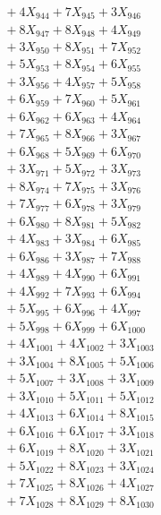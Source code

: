\documentclass[a4paper,10pt]{article}
\begin{document}
{\begin{align}
&\;  + 4 X_{944} + 7 X_{945} + 3 X_{946} \\[0.3ex]
&\;  + 8 X_{947} + 8 X_{948} + 4 X_{949} \\[0.3ex]
&\;  + 3 X_{950} + 8 X_{951} + 7 X_{952} \\[0.3ex]
&\;  + 5 X_{953} + 8 X_{954} + 6 X_{955} \\[0.3ex]
&\;  + 3 X_{956} + 4 X_{957} + 5 X_{958} \\[0.3ex]
&\;  + 6 X_{959} + 7 X_{960} + 5 X_{961} \\[0.3ex]
&\;  + 6 X_{962} + 6 X_{963} + 4 X_{964} \\[0.3ex]
&\;  + 7 X_{965} + 8 X_{966} + 3 X_{967} \\[0.3ex]
&\;  + 6 X_{968} + 5 X_{969} + 6 X_{970} \\[0.5ex]\allowbreak
&\;  + 3 X_{971} + 5 X_{972} + 3 X_{973} \\[0.3ex]
&\;  + 8 X_{974} + 7 X_{975} + 3 X_{976} \\[0.3ex]
&\;  + 7 X_{977} + 6 X_{978} + 3 X_{979} \\[0.3ex]
&\;  + 6 X_{980} + 8 X_{981} + 5 X_{982} \\[0.3ex]
&\;  + 4 X_{983} + 3 X_{984} + 6 X_{985} \\[0.3ex]
&\;  + 6 X_{986} + 3 X_{987} + 7 X_{988} \\[0.3ex]
&\;  + 4 X_{989} + 4 X_{990} + 6 X_{991} \\[0.3ex]
&\;  + 4 X_{992} + 7 X_{993} + 6 X_{994} \\[0.3ex]
&\;  + 5 X_{995} + 6 X_{996} + 4 X_{997} \\[0.3ex]
&\;  + 5 X_{998} + 6 X_{999} + 6 X_{1000} \\[0.5ex]\allowbreak
&\;  + 4 X_{1001} + 4 X_{1002} + 3 X_{1003} \\[0.3ex]
&\;  + 3 X_{1004} + 8 X_{1005} + 5 X_{1006} \\[0.3ex]
&\;  + 5 X_{1007} + 3 X_{1008} + 3 X_{1009} \\[0.3ex]
&\;  + 3 X_{1010} + 5 X_{1011} + 5 X_{1012} \\[0.3ex]
&\;  + 4 X_{1013} + 6 X_{1014} + 8 X_{1015} \\[0.3ex]
&\;  + 6 X_{1016} + 6 X_{1017} + 3 X_{1018} \\[0.3ex]
&\;  + 6 X_{1019} + 8 X_{1020} + 3 X_{1021} \\[0.3ex]
&\;  + 5 X_{1022} + 8 X_{1023} + 3 X_{1024} \\[0.3ex]
&\;  + 7 X_{1025} + 8 X_{1026} + 4 X_{1027} \\[0.3ex]
&\;  + 7 X_{1028} + 8 X_{1029} + 8 X_{1030} \\[0.5ex]\allowbreak

\end{align}}
\end{document}
